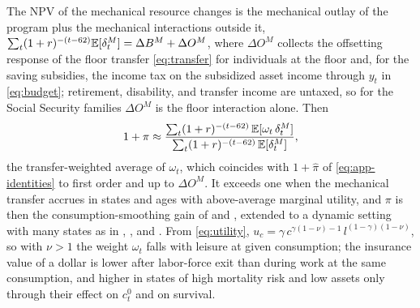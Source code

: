The NPV of the mechanical resource changes is the mechanical outlay of the program plus the mechanical interactions outside it, $\sum_t(1+r)^{-(t-62)}{\mathbb E}[\delta^{M}_t]=\Delta B^{M}+\Delta O^{M}$, where $\Delta O^{M}$ collects the offsetting response of the floor transfer \eqref{eq:transfer} for individuals at the floor and, for the saving subsidies, the income tax on the subsidized asset income through $y_t$ in \eqref{eq:budget}; retirement, disability, and transfer income are untaxed, so for the Social Security families $\Delta O^{M}$ is the floor interaction alone. Then
\begin{equation}\label{eq:app-pi}
1+\pi\approx\frac{\sum_{t}(1+r)^{-(t-62)}\,{\mathbb E}[\omega_t\,\delta^{M}_t]}{\sum_{t}(1+r)^{-(t-62)}\,{\mathbb E}[\delta^{M}_t]} ,
\end{equation}
the transfer-weighted average of $\omega_t$, which coincides with $1+\hat\pi$ of \eqref{eq:app-identities} to first order and up to $\Delta O^{M}$. It exceeds one when the mechanical transfer accrues in states and ages with above-average marginal utility, and $\pi$ is then the consumption-smoothing gain of \citet{baily1978some} and \citet{chetty2006general}, extended to a dynamic setting with many states as in \citet{chetty2009sufficient}, \citet{landais2021value}, and \citet{kolsrud2024retirement}. From \eqref{eq:utility}, $u_c=\gamma\,c^{\gamma(1-\nu)-1}\,l^{(1-\gamma)(1-\nu)}$, so with $\nu>1$ the weight $\omega_t$ falls with leisure at given consumption; the insurance value of a dollar is lower after labor-force exit than during work at the same consumption, and higher in states of high mortality risk and low assets only through their effect on $c^{0}_t$ and on survival.


